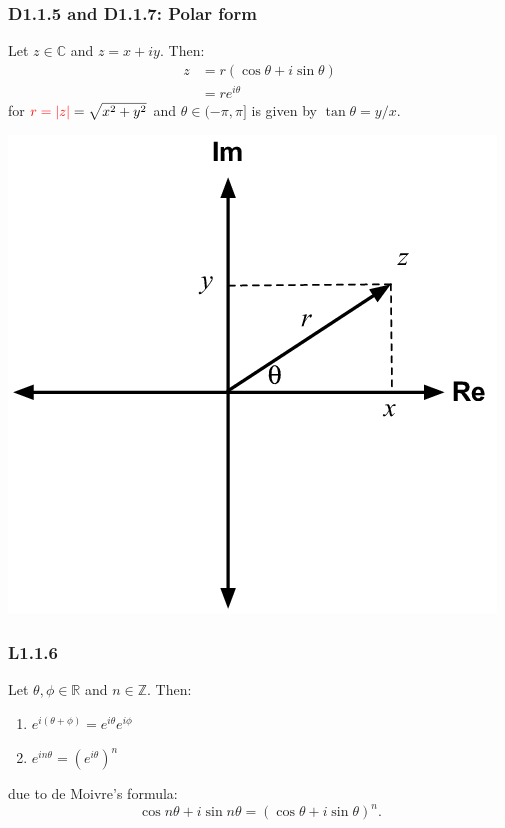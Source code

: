 \documentclass{article}
\begin{document}
\begin{multicols*}{3}
\subsubsection*{D1.1.5 and D1.1.7: Polar form}
Let $z\in\mathbb{C}$ and $z=x+iy$. Then:
\begin{align*}
    z
    &=r(\cos\theta+i\sin\theta) \\
    &=re^{i\theta}
\end{align*}
for $\textcolor{red}{r=|z|}=\sqrt{x^2+y^2}$ and
$\theta\in(-\pi,\pi]$ is given by $\tan\theta=y/x$.
\begin{center}
    \includegraphics[scale=0.2]{f0.png}
\end{center}

\subsubsection*{L1.1.6}
Let $\theta,\phi\in\mathbb{R}$ and $n\in\mathbb{Z}$. Then:
\begin{enumerate}
    \item $e^{i(\theta+\phi)}=e^{i\theta}e^{i\phi}$
    
    \item $e^{in\theta}=(e^{i\theta})^n$
\end{enumerate}
due to de Moivre's formula:
$$\cos n\theta+i\sin n\theta=(\cos \theta+i\sin \theta)^n.$$


\end{multicols*}
\end{document}
